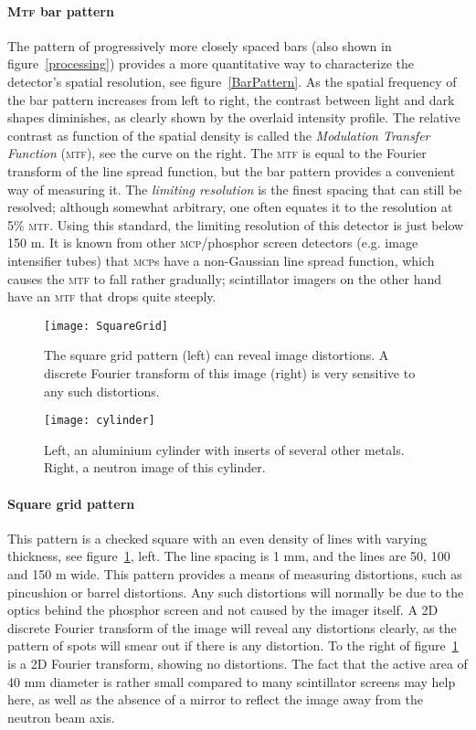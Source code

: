 \documentclass[a4paper,11pt]{article}
\begin{document}
\paragraph{\textsc{Mtf} bar pattern}
The pattern of progressively more closely spaced bars (also shown in figure~\ref{processing}) provides a more quantitative way to characterize the detector's spatial resolution, see figure~\ref{BarPattern}.
As the spatial frequency of the bar pattern increases from left to right, the contrast between light and dark shapes diminishes, as clearly shown by the overlaid intensity profile.
The relative contrast as function of the spatial density is called the \emph{Modulation Transfer Function} (\textsc{mtf}), see the curve on the right.
The \textsc{mtf} is equal to the Fourier transform of the line spread function, but the bar pattern provides a convenient way of measuring it.
The \emph{limiting resolution} is the finest spacing that can still be resolved; although somewhat arbitrary, one often equates it to the resolution at 5\% \textsc{mtf}.
Using this standard, the limiting resolution of this detector is just below 150 \textmu m.
It is known from other \textsc{mcp}/phosphor screen detectors (e.g. image intensifier tubes) that \textsc{mcp}s have a non-Gaussian line spread function, which causes the \textsc{mtf} to fall rather gradually; scintillator imagers on the other hand have an \textsc{mtf} that drops quite steeply.

\begin{figure}[b]
	\centering\texttt{[image: SquareGrid]}
	\caption{The square grid pattern (left) can reveal image distortions. A discrete Fourier transform of this image (right) is very sensitive to any such distortions.\label{SquareGrid}}
\end{figure}
\begin{figure}[tb]
	\centering\texttt{[image: cylinder]}
	\caption{Left, an aluminium cylinder with inserts of several other metals. Right, a neutron image of this cylinder.\label{cylinder}}
\end{figure}
\paragraph{Square grid pattern}
This pattern is a checked square with an even density of lines with varying thickness, see figure~\ref{SquareGrid}, left.
The line spacing is 1 mm, and the lines are 50, 100 and 150 \textmu m wide.
This pattern provides a means of measuring distortions, such as pincushion or barrel distortions.
Any such distortions will normally be due to the optics behind the phosphor screen and not caused by the imager itself.
A 2D discrete Fourier transform of the image will reveal any distortions clearly, as the pattern of spots will smear out if there is any distortion.
To the right of figure~\ref{SquareGrid} is a 2D Fourier transform, showing no distortions.
The fact that the active area of 40 mm diameter is rather small compared to many scintillator screens may help here, as well as the absence of a mirror to reflect the image away from the neutron beam axis.
\end{document}
